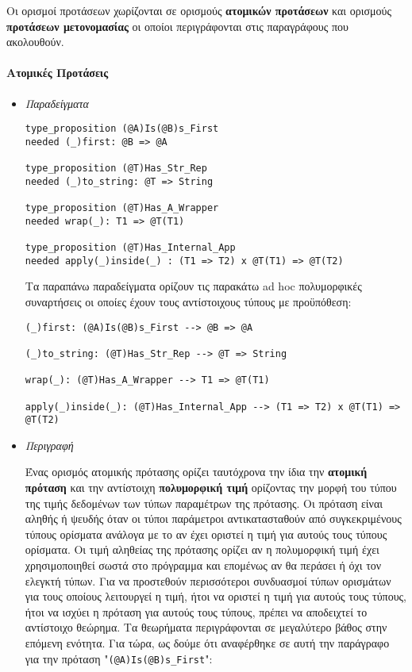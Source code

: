 \documentclass[diploma]{softlab-thesis}
\begin{document}
Οι ορισμοί προτάσεων χωρίζονται σε ορισμούς \textbf{ατομικών προτάσεων}
και ορισμούς \textbf{προτάσεων μετονομασίας} οι οποίοι περιγράφονται
στις παραγράφους που ακολουθούν.

\paragraph{Ατομικές Προτάσεις}

\begin{itemize}
\item \textit{Παραδείγματα}
\begin{verbatim}
type_proposition (@A)Is(@B)s_First
needed (_)first: @B => @A

type_proposition (@T)Has_Str_Rep
needed (_)to_string: @T => String

type_proposition (@T)Has_A_Wrapper
needed wrap(_): T1 => @T(T1)

type_proposition (@T)Has_Internal_App
needed apply(_)inside(_) : (T1 => T2) x @T(T1) => @T(T2)
\end{verbatim}
Τα παραπάνω παραδείγματα ορίζουν τις παρακάτω ad hoc πολυμορφικές συναρτήσεις
οι οποίες έχουν τους αντίστοιχους τύπους με προϋπόθεση:
\begin{verbatim}
(_)first: (@A)Is(@B)s_First --> @B => @A

(_)to_string: (@T)Has_Str_Rep --> @T => String

wrap(_): (@T)Has_A_Wrapper --> T1 => @T(T1)

apply(_)inside(_): (@T)Has_Internal_App --> (T1 => T2) x @T(T1) => @T(T2)
\end{verbatim}

\newpage

\item \textit{Περιγραφή}

Ένας ορισμός ατομικής πρότασης ορίζει ταυτόχρονα την ίδια την \textbf{ατομική
πρόταση} και την αντίστοιχη \textbf{πολυμορφική τιμή} ορίζοντας την μορφή του
τύπου της τιμής δεδομένων των τύπων παραμέτρων της πρότασης.  Οι πρόταση είναι
αληθής ή ψευδής όταν οι τύποι παράμετροι αντικατασταθούν από συγκεκριμένους
τύπους ορίσματα ανάλογα με το αν έχει οριστεί η τιμή για αυτούς τους τύπους
ορίσματα. Οι τιμή αληθείας της πρότασης ορίζει αν η πολυμορφική τιμή έχει
χρησιμοποιηθεί σωστά στο πρόγραμμα και επομένως αν θα περάσει ή όχι τον ελεγκτή
τύπων. Για να προστεθούν περισσότεροι συνδυασμοί τύπων ορισμάτων για τους
οποίους λειτουργεί η τιμή, ήτοι να οριστεί η τιμή για αυτούς τους τύπους, ήτοι
να ισχύει η πρόταση για αυτούς τους τύπους, πρέπει να αποδειχτεί το αντίστοιχο
θεώρημα. Τα θεωρήματα περιγράφονται σε μεγαλύτερο βάθος στην επόμενη ενότητα.
Για τώρα, ως δούμε ότι αναφέρθηκε σε αυτή την παράγραφο για την πρόταση
"\verb|(@A)Is(@B)s_First|":


\end{itemize}
\end{document}
